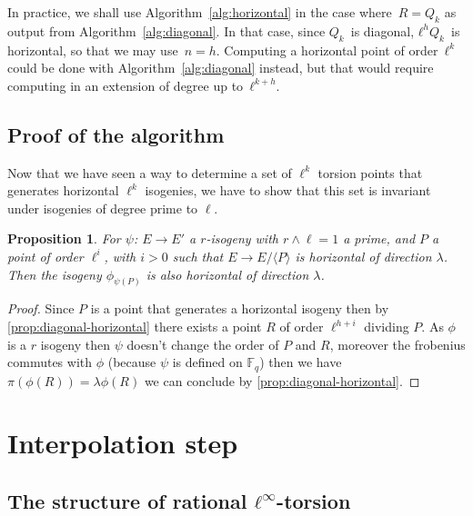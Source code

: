 \documentclass{lms}
\newtheorem{prop}[thm]{Proposition}
\begin{document}
In practice, we shall use Algorithm~\ref{alg:horizontal}
in the case where~$R = Q_{k}$ as output from Algorithm~\ref{alg:diagonal}.
In that case, since $Q_k$~is diagonal, $ℓ^{h} Q_k$~is horizontal,
so that we may use~$n=h$.
Computing a horizontal point of order~$ℓ^k$ could be done
with Algorithm~\ref{alg:diagonal} instead,
but that would require computing in an extension
of degree up to~$ℓ^{k+h}$.


\subsection{Proof of the algorithm}
Now that we have seen a way to determine a set of $\ell^{k}$ torsion points that generates horizontal $\ell^k$ isogenies, we have to show that this set is invariant under isogenies of degree prime to $\ell$.

\begin{prop}
For $\psi$: $E \rightarrow E'$ a $r$-isogeny  with $r \wedge \ell=1$ a prime, and $P$ a point of order $\ell^i$, with $i>0$ such that $E \rightarrow E / \langle P \rangle $ is horizontal of direction $\lambda$. Then the isogeny $\phi_{\psi(P)}$ is also horizontal of direction $\lambda$.
\end{prop}

\begin{proof}
Since $P$ is a point that generates a horizontal isogeny then by \ref{prop:diagonal-horizontal} there exists a point $R$ of order $\ell^{h+i}$ dividing $P$. As $\phi$ is a $r$ isogeny then $\psi$ doesn't change the order of $P$ and $R$, moreover the frobenius commutes with $\phi$ (because $\psi$ is defined on $\mathbb{F}_q$) then we have $\pi(\phi(R))=\lambda\phi(R)$ we can conclude by \ref{prop:diagonal-horizontal}.
\end{proof}



\section{Interpolation step}
\label{sec:interpolation}

\subsection{The structure of rational $ℓ^∞$-torsion}
\end{document}
